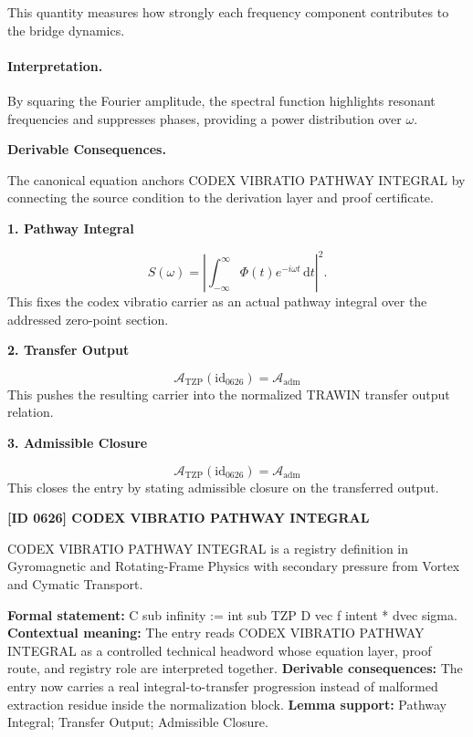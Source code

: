 This quantity measures how strongly each frequency component contributes to the bridge dynamics.

\paragraph{Interpretation.}

By squaring the Fourier amplitude, the spectral function highlights resonant frequencies and suppresses phases, providing a power distribution over $\omega$.

\par\vspace{0.35em}
\noindent\textbf{Derivable Consequences.}\quad
\begingroup
\footnotesize
\raggedright
The canonical equation anchors CODEX VIBRATIO PATHWAY INTEGRAL by connecting the source condition to the derivation layer and proof certificate.
\par\endgroup

\noindent\textbf{1. Pathway Integral}\par
\[
S(\omega) = \left| \int_{-\infty}^{\infty} \Phi(t) e^{-i\omega t} \, \mathrm{d}t \right|^2.
\]
\noindent This fixes the codex vibratio carrier as an actual pathway integral over the addressed zero-point section.\par
\noindent\textbf{2. Transfer Output}\par
\[
\mathcal{A}_{\mathrm{TZP}}(\mathrm{id}_{0626})=\mathcal{A}_{\mathrm{adm}}
\]
\noindent This pushes the resulting carrier into the normalized TRAWIN transfer output relation.\par
\noindent\textbf{3. Admissible Closure}\par
\[
\mathcal{A}_{\mathrm{TZP}}(\mathrm{id}_{0626})=\mathcal{A}_{\mathrm{adm}}
\]
\noindent This closes the entry by stating admissible closure on the transferred output.\par

\clearpage
\noindent\textbf{[ID 0626] CODEX VIBRATIO PATHWAY INTEGRAL}\par
\vspace{0.35em}
\begingroup\small
{}
CODEX VIBRATIO PATHWAY INTEGRAL is a registry definition in Gyromagnetic and Rotating-Frame Physics with secondary pressure from Vortex and Cymatic Transport.

\begingroup\footnotesize\setlength{\emergencystretch}{3em}\sloppy
\textbf{Formal statement:} C sub infinity := int sub TZP D vec f intent * dvec sigma. \textbf{Contextual meaning:} The entry reads CODEX VIBRATIO PATHWAY INTEGRAL as a controlled technical headword whose equation layer, proof route, and registry role are interpreted together. \textbf{Derivable consequences:} The entry now carries a real integral-to-transfer progression instead of malformed extraction residue inside the normalization block. \textbf{Lemma support:} Pathway Integral; Transfer Output; Admissible Closure.\par
\endgroup

